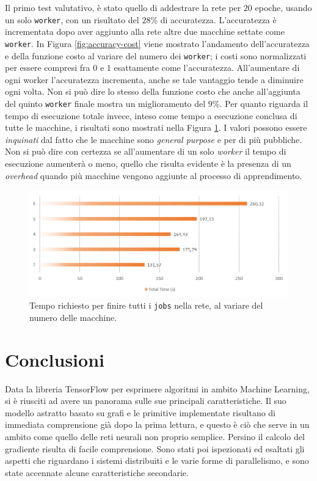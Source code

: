 \documentclass[DIV=calc, paper=a4, fontsize=11pt]{scrartcl}	 %
\begin{document}
\begin{multicols}{2}
			Il primo test valutativo, è stato quello di addestrare la rete per $20$ epoche, usando un solo \texttt{worker}, con un risultato del $28$\% di accuratezza. L'accuratezza è incrementata dopo aver aggiunto alla rete altre due macchine settate come \texttt{worker}. In Figura \ref{fig:accuracy-cost} viene mostrato l'andamento dell'accuratezza e della funzione costo al variare del numero dei \texttt{worker}; i costi sono normalizzati per essere compresi fra $0$ e $1$ esattamente come l'accuratezza. All'aumentare di ogni worker l'accuratezza incrementa, anche se tale vantaggio tende a diminuire ogni volta. Non si può dire lo stesso della funzione costo che anche all'aggiunta del quinto \texttt{worker} finale mostra un miglioramento del $9$\%. Per quanto riguarda il tempo di esecuzione totale invece, inteso come tempo a esecuzione conclusa di tutte le macchine, i risultati sono mostrati nella Figura \ref{fig:total-time}. I valori possono essere \textit{inquinati} dal fatto che le macchine sono \textit{general purpose} e per di più pubbliche. Non si può dire con certezza se all'aumentare di un solo \textit{worker} il tempo di esecuzione aumenterà o meno, quello che risulta evidente è la presenza di un \textit{overhead} quando più macchine vengono aggiunte al processo di apprendimento.
			\begin{figure}[th!]
				\centering
				\includegraphics[scale=.95]{img/total-time.png}
				\caption{Tempo richiesto per finire tutti i \texttt{jobs} nella rete, al variare del numero delle macchine.}
				\label{fig:total-time}
			\end{figure}
		
		\section{Conclusioni}
			Data la libreria TensorFlow per esprimere algoritmi in ambito Machine Learning, si è riusciti ad avere un panorama sulle sue principali caratteristiche. Il suo modello astratto basato su grafi e le primitive implementate risultano di immediata comprensione già dopo la prima lettura, e questo è ciò che serve in un ambito come quello delle reti neurali non proprio semplice. Persino il calcolo del gradiente risulta di facile comprensione. Sono stati poi ispezionati ed esaltati gli aspetti che riguardano i sistemi distribuiti e le varie forme di parallelismo, e sono state accennate alcune caratteristiche secondarie.
			

\end{multicols}
\end{document}
